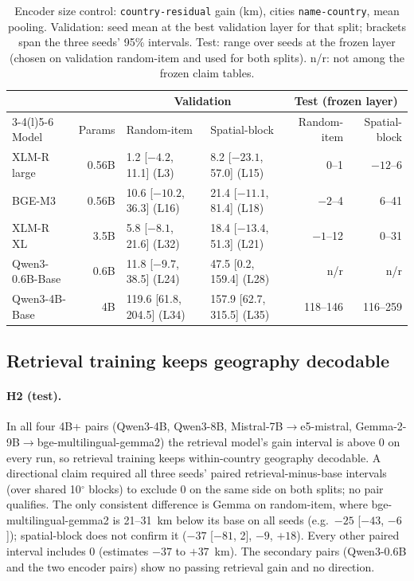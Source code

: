 \begin{table}[t]
\centering
\footnotesize
\caption{Encoder size control: \texttt{country-residual} gain (km), cities \texttt{name-country}, mean pooling. Validation: seed mean at the best validation layer for that split; brackets span the three seeds' 95\% intervals. Test: range over seeds at the frozen layer (chosen on validation random-item and used for both splits). n/r: not among the frozen claim tables.}
\label{tab:xl}
\begin{tabular}{@{}lrllrr@{}}
\toprule
& & \multicolumn{2}{c}{Validation} & \multicolumn{2}{c}{Test (frozen layer)} \\
\cmidrule(lr){3-4}\cmidrule(l){5-6}
Model & Params & Random-item & Spatial-block & Random-item & Spatial-block \\
\midrule
XLM-R large & 0.56B & 1.2 [$-4.2$, 11.1] (L3) & 8.2 [$-23.1$, 57.0] (L15) & 0--1 & $-12$--6 \\
BGE-M3 & 0.56B & 10.6 [$-10.2$, 36.3] (L16) & 21.4 [$-11.1$, 81.4] (L18) & $-2$--4 & 6--41 \\
XLM-R XL & 3.5B & 5.8 [$-8.1$, 21.6] (L32) & 18.4 [$-13.4$, 51.3] (L21) & $-1$--12 & 0--31 \\
Qwen3-0.6B-Base & 0.6B & 11.8 [$-9.7$, 38.5] (L24) & 47.5 [0.2, 159.4] (L28) & n/r & n/r \\
Qwen3-4B-Base & 4B & 119.6 [61.8, 204.5] (L34) & 157.9 [62.7, 315.5] (L35) & 118--146 & 116--259 \\
\bottomrule
\end{tabular}
\end{table}

\subsection{Retrieval training keeps geography decodable}
\label{sec:res-retrieval}

\paragraph{H2 (test).}
In all four 4B+ pairs (Qwen3-4B, Qwen3-8B, Mistral-7B$\to$e5-mistral, Gemma-2-9B$\to$bge-multilingual-gemma2) the retrieval model's gain interval is above 0 on every run, so retrieval training keeps within-country geography decodable. A directional claim required all three seeds' paired retrieval-minus-base intervals (over shared 10$^\circ$ blocks) to exclude 0 on the same side on both splits; no pair qualifies. The only consistent difference is Gemma on random-item, where bge-multilingual-gemma2 is 21--31~km below its base on all seeds (e.g.\ $-25$ [$-43$, $-6$]); spatial-block does not confirm it ($-37$ [$-81$, 2], $-9$, $+18$). Every other paired interval includes 0 (estimates $-37$ to $+37$~km). The secondary pairs (Qwen3-0.6B and the two encoder pairs) show no passing retrieval gain and no direction.

